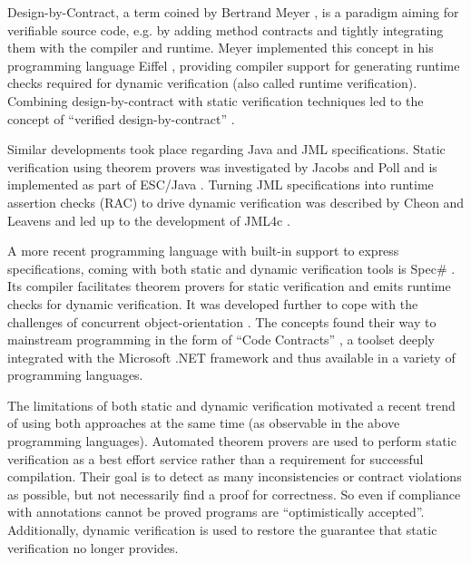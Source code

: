 Design-by-Contract, a term coined by Bertrand Meyer \cite{meyer2002design}, is a paradigm aiming for verifiable source code, e.g. by adding method contracts and tightly integrating them with the compiler and runtime.
Meyer implemented this concept in his programming language Eiffel \cite{meyer1988eiffel}, providing compiler support for generating runtime checks required for dynamic verification (also called runtime verification).
Combining design-by-contract with static verification techniques led to the concept of “verified design-by-contract” \cite{crocker2004safe}.

Similar developments took place regarding Java and JML specifications.
Static verification using theorem provers was investigated by Jacobs and Poll \cite{jacobs2001logic} and is implemented as part of ESC/Java \cite{nelson2004extended}.
Turning JML specifications into runtime assertion checks (RAC) to drive dynamic verification was described by Cheon and Leavens \cite{cheon2002runtime} and led up to the development of JML4c \cite{sarcar2010new}.

A more recent programming language with built-in support to express specifications, coming with both static and dynamic verification tools is Spec\# \cite{the-spec-programming-system-an-overview}.
Its compiler facilitates theorem provers for static verification and emits runtime checks for dynamic verification.
It was developed further to cope with the challenges of concurrent object-orientation \cite{a-statically-verifiable-programming-model-for-concurrent-object-oriented-programs}.
The concepts found their way to mainstream programming in the form of “Code Contracts” \cite{embedded-contract-languages}, a toolset deeply integrated with the Microsoft .NET framework and thus available in a variety of programming languages.

The limitations of both static and dynamic verification motivated a recent trend of using both approaches at the same time (as observable in the above programming languages).
Automated theorem provers are used to perform static verification as a best effort service rather than a requirement for successful compilation.
Their goal is to detect as many inconsistencies or contract violations as possible, but not necessarily find a proof for correctness.
So even if compliance with annotations cannot be proved programs are “optimistically accepted”.
Additionally, dynamic verification is used to restore the guarantee that static verification no longer provides.

